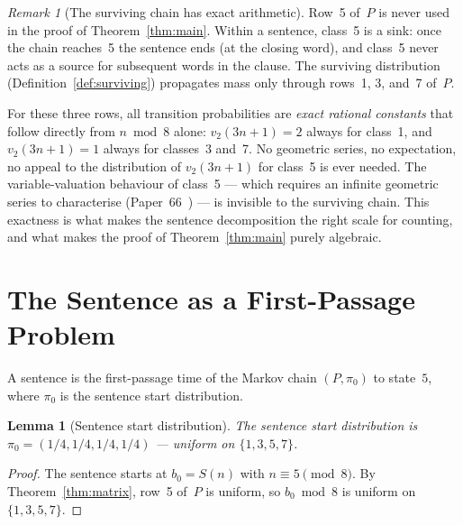 \documentclass[12pt]{article}
\newtheorem{lemma}[theorem]{Lemma}
\theoremstyle{definition}
\theoremstyle{remark}
\newtheorem{remark}[theorem]{Remark}
\newcommand{\vt}{v_2}
\newcommand{\Sm}{S}
\begin{document}
\begin{remark}[The surviving chain has exact arithmetic]
\label{rem:exact}
Row~5 of~$P$ is never used in the proof of Theorem~\ref{thm:main}.
Within a sentence, class~5 is a sink: once the chain reaches~5
the sentence ends (at the closing word), and class~5 never acts as a
source for subsequent words in the clause.
The surviving distribution (Definition~\ref{def:surviving}) propagates
mass only through rows~1, 3, and~7 of~$P$.

For these three rows, all transition probabilities are \emph{exact rational
constants} that follow directly from $n \bmod 8$ alone:
$\vt(3n+1) = 2$ always for class~1, and $\vt(3n+1) = 1$ always for
classes~3 and~7.
No geometric series, no expectation, no appeal to the distribution of
$\vt(3n+1)$ for class~5 is ever needed.
The variable-valuation behaviour of class~5 — which requires an
infinite geometric series to characterise (Paper~66~\cite{paper66}) —
is invisible to the surviving chain.
This exactness is what makes the sentence decomposition the right scale
for counting, and what makes the proof of Theorem~\ref{thm:main} purely
algebraic.
\end{remark}

\section{The Sentence as a First-Passage Problem}
\label{sec:firstpassage}

A sentence is the first-passage time of the Markov chain $(P, \pi_0)$ to
state~$5$, where $\pi_0$ is the sentence start distribution.

\begin{lemma}[Sentence start distribution]
\label{lem:start}
The sentence start distribution is
$\pi_0 = (1/4, 1/4, 1/4, 1/4)$ — uniform on $\{1,3,5,7\}$.
\end{lemma}

\begin{proof}
The sentence starts at $b_0 = \Sm(n)$ with $n \equiv 5 \pmod 8$.
By Theorem~\ref{thm:matrix}, row~5 of~$P$ is uniform,
so $b_0 \bmod 8$ is uniform on $\{1,3,5,7\}$.
\end{proof}
\end{document}
